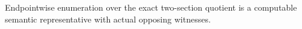 Endpointwise enumeration over the exact two-section quotient is a computable semantic representative with actual opposing witnesses.
